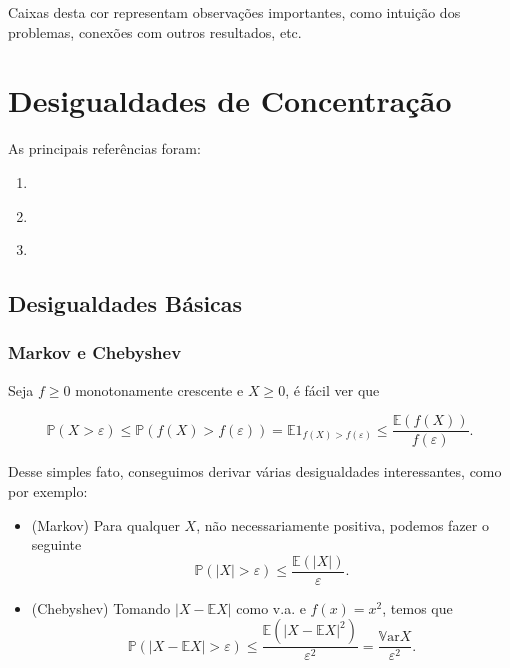 \documentclass[12pt,a4paper,oneside]{book}
\theoremstyle{definition}
\theoremstyle{remark}
\numberwithin{equation}{section}
\newcommand{\e}{\varepsilon}
\newcommand{\E}{\mathbb{E}}
\newcommand{\pr}{\mathbb{P}}
\newcommand{\Var}{\mathbb{V}\text{ar}}
\begin{document}
\begin{tcolorbox}[colback = yellow!70]
Caixas desta cor representam observações importantes, como intuição dos problemas, conexões com outros resultados, etc.
\end{tcolorbox}





\chapter{Desigualdades de Concentração}
\begin{tcolorbox}[colback= white]
As principais referências foram:
\begin{enumerate}
\item \cite{boucheron2013concentration}
\item \cite{vershynin_2018}
\item \cite{taomatrix}
\end{enumerate}
\end{tcolorbox}

\section{Desigualdades Básicas}

\subsection{Markov e Chebyshev}

Seja $f\geq 0$ monotonamente crescente e $X\geq 0$, é fácil ver que

\begin{equation}\label{markovineq}
\pr(X>\e) \leq \pr(f(X)>f(\e)) = \E 1_{f(X)>f(\e)} \leq \dfrac{\E(f(X))}{f(\e)}.
\end{equation}

Desse simples fato, conseguimos derivar várias desigualdades interessantes, como por exemplo:

\begin{itemize}
\item  (Markov) Para qualquer $X$, não necessariamente positiva, podemos fazer o seguinte  $$\pr(|X|>\e)  \leq \dfrac{\E(|X|)}{\e}.$$
\item (Chebyshev) Tomando $|X-\E X|$ como v.a. e $f(x)=x^2$, temos que
$$\pr(|X-\E X|>\e)  \leq \dfrac{ \E(|X-\E X|^2) }{\e^2} =\dfrac{ \Var X }{\e^2} .$$

\end{itemize}
\end{document}
